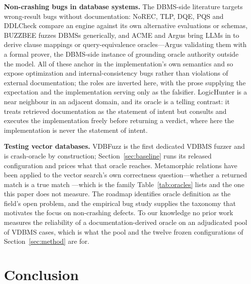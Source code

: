 \documentclass[acmsmall,screen,review,anonymous]{acmart}
\begin{document}
\textbf{Non-crashing bugs in database systems.} The DBMS-side literature targets wrong-result bugs
without documentation: NoREC, TLP, DQE, PQS and DDLCheck \cite{norec20,tlp20,dqe23,pqs20,ddlcheck25}
compare an engine against its own alternative evaluations or schemas, BUZZBEE \cite{buzzbee24}
fuzzes DBMSs generically, and ACME \cite{acme26} and Argus \cite{argus25} bring LLMs in to derive
clause mappings or query-equivalence oracles---Argus validating them with a formal prover, the
DBMS-side instance of grounding oracle authority outside the model. All of these anchor in the
implementation's own semantics and so expose optimization and internal-consistency bugs rather than
violations of external documentation; the roles are inverted here, with the prose supplying the
expectation and the implementation serving only as the falsifier. LogicHunter \cite{logichunter26}
is a near neighbour in an adjacent domain, and its oracle is a telling contrast: it treats retrieved
documentation as the statement of intent but consults and executes the implementation freely before
returning a verdict, where here the implementation is never the statement of intent.

\textbf{Testing vector databases.} VDBFuzz \cite{vdbfuzz26} is the first dedicated VDBMS fuzzer and
is crash-oracle by construction; Section~\ref{sec:baseline} runs its released configuration and
prices what that oracle reaches. Metamorphic relations have been applied to the vector search's own
correctness question---whether a returned match is a true match \cite{metmap24}---which is the family
Table~\ref{tab:oracles} lists and the one this paper does not measure. The roadmap \cite{roadmap25} identifies oracle definition as the
field's open problem, and the empirical bug study \cite{bugstudy25} supplies the taxonomy that
motivates the focus on non-crashing defects. To our knowledge no prior work measures the reliability
of a documentation-derived oracle on an adjudicated pool of VDBMS cases, which is what the pool and
the twelve frozen configurations of Section~\ref{sec:method} are for.

\section{Conclusion}
\label{sec:conclusion}
\end{document}
